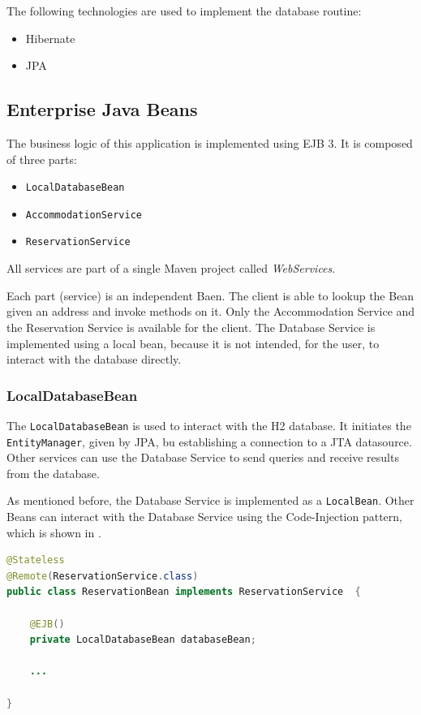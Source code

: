 The following technologies are used to implement the database routine:
\begin{itemize}
\item Hibernate
\item JPA
\end{itemize}


\subsection{Enterprise Java Beans}\label{sec:02_impl_beans}
The business logic of this application is implemented using EJB 3. It is composed of three parts:
\begin{itemize}
\item \texttt{LocalDatabaseBean}
\item \texttt{AccommodationService}
\item \texttt{ReservationService}
\end{itemize}
All services are part of a single Maven project called \textit{WebServices}.

Each part (service) is an independent Baen. The client is able to lookup the Bean given an address and invoke methods on it. Only the Accommodation Service and the Reservation Service is available for the client. The Database Service is implemented using a local bean, because it is not intended, for the user, to interact with the database directly.


\subsubsection{LocalDatabaseBean}\label{sec:02_impl_beans_local}
The \texttt{LocalDatabaseBean} is used to interact with the H2 database. It initiates the \texttt{EntityManager}, given by JPA, bu establishing a connection to a JTA datasource. Other services can use the Database Service to send queries and receive results from the database.

As mentioned before, the Database Service is implemented as a \texttt{LocalBean}. Other Beans can interact with the Database Service using the Code-Injection pattern, which is shown in .
\begin{lstlisting}[label=lst:02_impl_ejb_db_cinjection, caption=Usage of the \texttt{LocalDatabaseBean} using Code-Injection, language=java]
@Stateless
@Remote(ReservationService.class)
public class ReservationBean implements ReservationService  {

    @EJB()
    private LocalDatabaseBean databaseBean;
    
    ...
    
}
\end{lstlisting}


